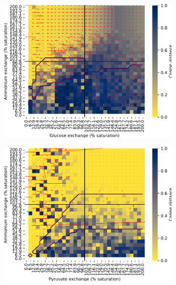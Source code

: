 \begin{figure}[htb!]
  \centering
  \begin{subfigure}[t]{0.45\textwidth}
  \centering
    \includegraphics[width=\linewidth]{ec_grid_glc_amm_cosine}
    \caption{
    }
    \label{fig:model-noisy-glc-cosine}
  \end{subfigure}%
  \begin{subfigure}[t]{0.45\textwidth}
  \centering
    \includegraphics[width=\linewidth]{ec_grid_pyr_amm_cosine}
    \caption{
    }
    \label{fig:model-noisy-pyr-cosine}
  \end{subfigure}


\end{figure}
